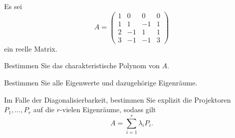 \begin{Problem}
	Es sei
	\[
		A=\begin{pmatrix} 1 & 0 & 0 & 0 \\ 1 & 1 & -1 & 1 \\ 2 & -1 & 1 & 1\\3 & -1 & -1 & 3 \end{pmatrix} 
	\]
	ein reelle Matrix.
	\begin{parts}
	\item Bestimmen Sie das charakteristische Polynom von $A$.
	\item Bestimmen Sie alle Eigenwerte und dazugehörige Eigenräume.
	\item Im Falle der Diagonalisierbarkeit, bestimmen Sie explizit die Projektoren $P_1,\dots, P_r$ auf die $r$-vielen Eigenräume, sodass gilt
	\[
		A=\sum_{i=1}^r \lambda_i P_i
	.\] 
	\end{parts}
\end{Problem}
